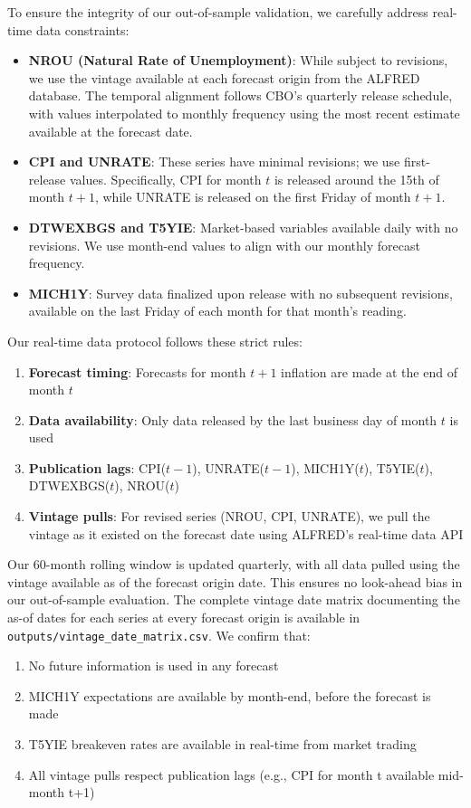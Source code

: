 \documentclass[12pt]{article}
\begin{document}
To ensure the integrity of our out-of-sample validation, we carefully address real-time data constraints:

\begin{itemize}
\item \textbf{NROU (Natural Rate of Unemployment)}: While subject to revisions, we use the vintage available at each forecast origin from the ALFRED database. The temporal alignment follows CBO's quarterly release schedule, with values interpolated to monthly frequency using the most recent estimate available at the forecast date.
\item \textbf{CPI and UNRATE}: These series have minimal revisions; we use first-release values. Specifically, CPI for month $t$ is released around the 15th of month $t+1$, while UNRATE is released on the first Friday of month $t+1$.
\item \textbf{DTWEXBGS and T5YIE}: Market-based variables available daily with no revisions. We use month-end values to align with our monthly forecast frequency.
\item \textbf{MICH1Y}: Survey data finalized upon release with no subsequent revisions, available on the last Friday of each month for that month's reading.
\end{itemize}

Our real-time data protocol follows these strict rules:
\begin{enumerate}
\item \textbf{Forecast timing}: Forecasts for month $t+1$ inflation are made at the end of month $t$
\item \textbf{Data availability}: Only data released by the last business day of month $t$ is used
\item \textbf{Publication lags}: CPI($t-1$), UNRATE($t-1$), MICH1Y($t$), T5YIE($t$), DTWEXBGS($t$), NROU($t$)
\item \textbf{Vintage pulls}: For revised series (NROU, CPI, UNRATE), we pull the vintage as it existed on the forecast date using ALFRED's real-time data API
\end{enumerate}

Our 60-month rolling window is updated quarterly, with all data pulled using the vintage available as of the forecast origin date. This ensures no look-ahead bias in our out-of-sample evaluation. The complete vintage date matrix documenting the as-of dates for each series at every forecast origin is available in \texttt{outputs/vintage\_date\_matrix.csv}. We confirm that:
\begin{enumerate}
\item No future information is used in any forecast
\item MICH1Y expectations are available by month-end, before the forecast is made
\item T5YIE breakeven rates are available in real-time from market trading
\item All vintage pulls respect publication lags (e.g., CPI for month t available mid-month t+1)
\end{enumerate}
\end{document}
